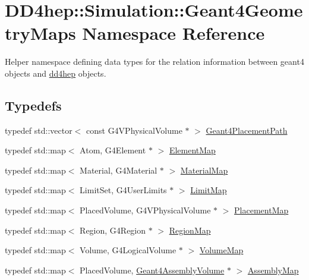 \hypertarget{namespace_d_d4hep_1_1_simulation_1_1_geant4_geometry_maps}{
\section{DD4hep::Simulation::Geant4GeometryMaps Namespace Reference}
\label{namespace_d_d4hep_1_1_simulation_1_1_geant4_geometry_maps}
}


Helper namespace defining data types for the relation information between geant4 objects and \hyperlink{namespacedd4hep}{dd4hep} objects.  
\subsection*{Typedefs}
\begin{DoxyCompactItemize}
\item 
typedef std::vector$<$ const G4VPhysicalVolume $\ast$ $>$ \hyperlink{namespace_d_d4hep_1_1_simulation_1_1_geant4_geometry_maps_a8a325934adb143cb1cbc47dd030395ed}{Geant4PlacementPath}
\item 
typedef std::map$<$ Atom, G4Element $\ast$ $>$ \hyperlink{namespace_d_d4hep_1_1_simulation_1_1_geant4_geometry_maps_a175b532b796e7de3d9128c1f0e1ee406}{ElementMap}
\item 
typedef std::map$<$ Material, G4Material $\ast$ $>$ \hyperlink{namespace_d_d4hep_1_1_simulation_1_1_geant4_geometry_maps_a0ae377c64e684c47bd3045a9d3d8e248}{MaterialMap}
\item 
typedef std::map$<$ LimitSet, G4UserLimits $\ast$ $>$ \hyperlink{namespace_d_d4hep_1_1_simulation_1_1_geant4_geometry_maps_a338013d6709b82358b8e2490cdba0ed2}{LimitMap}
\item 
typedef std::map$<$ PlacedVolume, G4VPhysicalVolume $\ast$ $>$ \hyperlink{namespace_d_d4hep_1_1_simulation_1_1_geant4_geometry_maps_a587c0a02d3847f03e6427093c90e93d2}{PlacementMap}
\item 
typedef std::map$<$ Region, G4Region $\ast$ $>$ \hyperlink{namespace_d_d4hep_1_1_simulation_1_1_geant4_geometry_maps_afb7f77d7599fee831bfb2341123e8377}{RegionMap}
\item 
typedef std::map$<$ Volume, G4LogicalVolume $\ast$ $>$ \hyperlink{namespace_d_d4hep_1_1_simulation_1_1_geant4_geometry_maps_a85199a23e6a837678c8e5d5f902fb2e2}{VolumeMap}
\item 
typedef std::map$<$ PlacedVolume, \hyperlink{class_d_d4hep_1_1_simulation_1_1_geant4_assembly_volume}{Geant4AssemblyVolume} $\ast$ $>$ \hyperlink{namespace_d_d4hep_1_1_simulation_1_1_geant4_geometry_maps_ae1f67e315dd299b17e4ea1c58a47b312}{AssemblyMap}

\end{DoxyCompactItemize}
